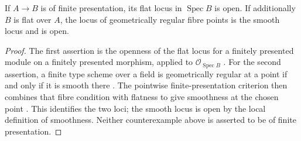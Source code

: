 \begin{proposition}\label{SA23-A-13}
If $A\to B$ is of finite presentation, its
flat locus in $\operatorname{Spec}B$ is open.  If additionally
$B$ is flat over $A$, the locus of geometrically regular fibre
points is the smooth locus and is open.
\end{proposition}
\begin{proof}
The first assertion is the openness of the flat locus for a
finitely presented module on a finitely presented morphism,
applied to $\mathcal O_{\operatorname{Spec}B}$
\cite[Theorem 37.15.1]{rootStacksOpenFlat}.
For the second assertion, a finite type scheme over a field is
geometrically regular at a point if and only if it is smooth there
\cite[Lemma 33.12.6]{rootStacksSmoothFibres}. The pointwise
finite-presentation criterion then combines that fibre condition
with flatness to give smoothness at the chosen point
\cite[Lemma 10.137.16]{rootStacksSmoothFibres}.
This identifies the two loci; the smooth locus is open by the local
definition of smoothness. Neither
counterexample above is asserted to be of finite presentation.
\end{proof}
